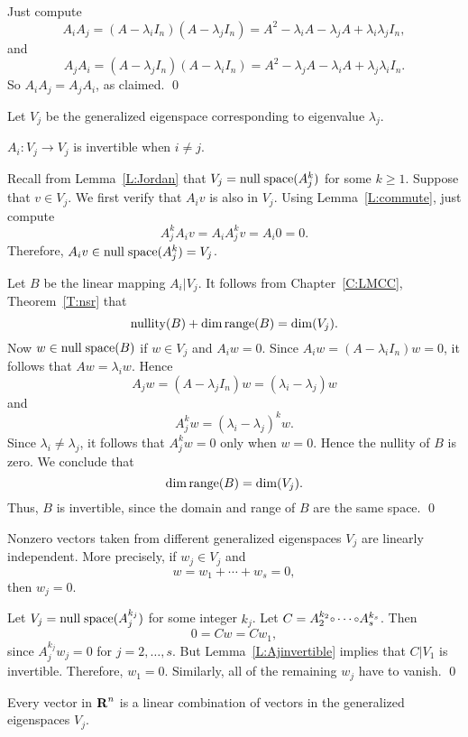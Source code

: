 \proof Just compute
\[
A_iA_j = (A-\lambda_iI_n)(A-\lambda_jI_n)= A^2-\lambda_iA-\lambda_jA+
\lambda_i\lambda_jI_n,
\]
and
\[
A_jA_i = (A-\lambda_jI_n)(A-\lambda_iI_n)= A^2-\lambda_jA-\lambda_iA+
\lambda_j\lambda_iI_n.
\]
So $A_iA_j=A_jA_i$, as claimed.  \qed

Let $V_j$ be the generalized eigenspace corresponding to eigenvalue 
$\lambda_j$. 

\begin{lemma}  \label{L:Ajinvertible}
$A_i:V_j\to V_j$ is invertible when $i\neq j$.
\end{lemma}

\proof  Recall from Lemma~\ref{L:Jordan} that $V_j={\rm null\;space}(A_j^k)$ for some 
$k\ge 1$.  Suppose that $v\in V_j$.  We first verify that $A_iv$ is also in 
$V_j$.  Using Lemma~\ref{L:commute}, just compute 
\[
A_j^kA_iv = A_iA_j^kv = A_i0 = 0.
\]
Therefore, $A_iv\in{\rm null\;space}(A_j^k)=V_j$.
 
Let $B$ be the linear mapping $A_i|V_j$.  It follows from
Chapter~\ref{C:LMCC}, Theorem~\ref{T:nsr} that
\[
{\rm nullity}(B) +\dim{\rm range}(B) = \dim(V_j).
\]
Now $w\in{\rm null\;space}(B)$ if $w\in V_j$ and $A_iw=0$.  Since
$A_iw = (A-\lambda_iI_n)w = 0$, it follows that $Aw = \lambda_iw$.  Hence 
\[
A_jw = (A-\lambda_jI_n)w = (\lambda_i-\lambda_j)w
\]
and
\[
A_j^kw = (\lambda_i-\lambda_j)^kw.
\]
Since $\lambda_i\neq\lambda_j$, it follows that $A_j^kw=0$ only when $w=0$.
Hence the nullity of $B$ is zero.  We conclude that
\[
\dim{\rm range}(B) = \dim(V_j).
\]
Thus, $B$ is invertible, since the domain and range of $B$ are the same
space.  \qed

\begin{lemma}  \label{L:independentVj}
Nonzero vectors taken from different generalized eigenspaces $V_j$ are 
linearly independent.  More precisely, if $w_j\in V_j$ and 
\[
w = w_1 + \cdots + w_s = 0,
\]
then $w_j=0$.  
\end{lemma}

\proof Let $V_j={\rm null\;space}(A_j^{k_j})$ for some integer $k_j$.  Let
$C=A_2^{k_2}\compose\cdots\compose A_s^{k_s}$. Then 
\[
0 = Cw = Cw_1,
\]
since $A_j^{k_j}w_j=0$ for $j=2,\ldots,s$.   But Lemma~\ref{L:Ajinvertible} 
implies that $C|V_1$ is invertible.  Therefore, $w_1=0$.  Similarly, all of 
the remaining $w_j$ have to vanish.  \qed

\begin{lemma}  \label{L:spanVj}
Every vector in $\mbox{$\bf{R}$}^n$ is a linear combination of vectors in the generalized 
eigenspaces $V_j$.
\end{lemma}

